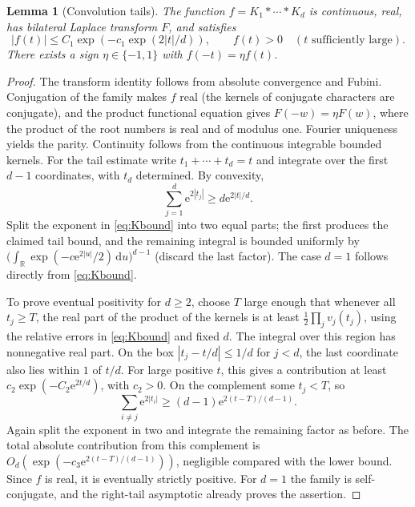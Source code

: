 \documentclass[11pt]{article}
\newtheorem{lemma}[theorem]{Lemma}
\theoremstyle{remark}\newtheorem{remark}[theorem]{Remark}
\newcommand{\R}{\mathbb R}\newcommand{\C}{\mathbb C}\newcommand{\dd}{\,\mathrm d}
\newcommand{\ee}{\mathrm e}\newcommand{\abs}[1]{\lvert#1\rvert}
\begin{document}
\begin{lemma}[Convolution tails]\label{lem:tails}
The function $f=K_1*\cdots*K_d$ is continuous, real, has bilateral Laplace transform $F$, and satisfies
\[
 |f(t)|\le C_1\exp(-c_1\exp(2|t|/d)),\qquad f(t)>0\quad(t\text{ sufficiently large}).
\]
There exists a sign $\eta\in\{-1,1\}$ with $f(-t)=\eta f(t)$.
\end{lemma}
\begin{proof}
The transform identity follows from absolute convergence and Fubini. Conjugation of the family makes $f$ real (the kernels of conjugate characters are conjugate), and the product functional equation gives $F(-w)=\eta F(w)$, where the product of the root numbers is real and of modulus one. Fourier uniqueness yields the parity. Continuity follows from the continuous integrable bounded kernels. For the tail estimate write $t_1+\cdots+t_d=t$ and integrate over the first $d-1$ coordinates, with $t_d$ determined. By convexity,
\[
 \sum_{j=1}^d\ee^{2|t_j|}\ge d\ee^{2|t|/d}.
\]
Split the exponent in \eqref{eq:Kbound} into two equal parts; the first produces the claimed tail bound, and the remaining integral is bounded uniformly by
$\big(\int_\R\exp(-c\ee^{2|u|}/2)\dd u\big)^{d-1}$ (discard the last factor). The case $d=1$ follows directly from \eqref{eq:Kbound}.

To prove eventual positivity for $d\ge2$, choose $T$ large enough that whenever all $t_j\ge T$, the real part of the product of the kernels is at least $\frac12\prod_j v_j(t_j)$, using the relative errors in \eqref{eq:Kbound} and fixed $d$. The integral over this region has nonnegative real part. On the box $|t_j-t/d|\le 1/d$ for $j<d$, the last coordinate also lies within $1$ of $t/d$. For large positive $t$, this gives a contribution at least $c_2\exp(-C_2\ee^{2t/d})$, with $c_2>0$. On the complement some $t_j<T$, so
\[
 \sum_{i\ne j}\ee^{2|t_i|}\ge(d-1)\ee^{2(t-T)/(d-1)}.
\]
Again split the exponent in two and integrate the remaining factor as before. The total absolute contribution from this complement is $O_d(\exp(-c_3\ee^{2(t-T)/(d-1)}))$, negligible compared with the lower bound. Since $f$ is real, it is eventually strictly positive. For $d=1$ the family is self-conjugate, and the right-tail asymptotic already proves the assertion.
\end{proof}
\end{document}
